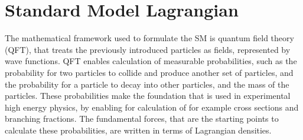 \section{Standard Model Lagrangian}
\noindent\justify
The mathematical framework used to formulate the SM is quantum field theory (QFT), that treats the previously introduced particles as fields, represented by wave functions. 
QFT enables calculation of measurable probabilities, such as the probability for two particles to collide and produce another set of particles, and the probability for a particle to decay into other particles, and the mass of the particles. 
These probabilities make the foundation that is used in experimental high energy physics, by enabling for calculation of for example cross sections and branching fractions. 
The fundamental forces, that are the starting points to calculate these probabilities, are written in terms of Lagrangian densities. 
